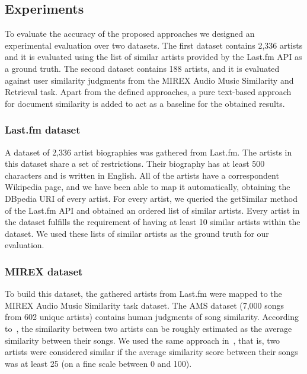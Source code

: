 \subsection{Experiments}
\label{sec:similarity:experimentalsetup}

To evaluate the accuracy of the proposed approaches we designed an experimental evaluation over two datasets. The first dataset contains 2,336 artists and it is evaluated using the list of similar artists provided by the Last.fm API as a ground truth. The second dataset contains 188 artists, and it is evaluated against user similarity judgments from the MIREX Audio Music Similarity and Retrieval task.
Apart from the defined approaches, a pure text-based approach for document similarity is added to act as a baseline for the obtained results.


\subsubsection{Last.fm dataset}\label{sec:similarity:lastfm_dataset}

A dataset of 2,336 artist biographies was gathered from Last.fm. The artists in this dataset share a set of restrictions.
Their biography has at least 500 characters and is written in English.
All of the artists have a correspondent Wikipedia page, and we have been able to map it automatically, obtaining the DBpedia URI of every artist.
For every artist, we queried the getSimilar method of the Last.fm API and obtained an ordered list of similar artists. Every artist in the dataset fulfills the requirement of having at least 10 similar artists within the dataset.
We used these lists of similar artists as the ground truth for our evaluation.

\subsubsection{MIREX dataset} %

To build this dataset, the gathered artists from Last.fm
were mapped to the MIREX Audio Music Similarity task dataset. The AMS dataset (7,000 songs from 602 unique artists) contains human judgments of song similarity. According to~\cite{Schedl2013}, the similarity between two artists can be roughly estimated as the average similarity between their songs. We used the same approach in~\cite{Schedl2013}, that is, two artists were considered similar if the average similarity score between their songs was at least 25 (on a fine scale between 0 and 100).

